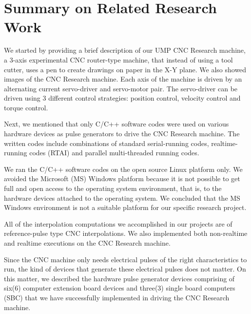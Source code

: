 \pagebreak
\section{Summary on Related Research Work}

We started by providing a brief description of our UMP CNC Research machine, a 3-axis experimental CNC router-type machine, that instead of using a tool cutter, uses a pen to create drawings on paper in the X-Y plane. We also showed images of the CNC Research machine. Each axis of the machine is driven by an alternating current servo-driver and servo-motor pair. The servo-driver can be driven using 3 different control strategies: position control, velocity control and torque control.
\vspace*{1\baselineskip}

Next, we mentioned that only C/C++ software codes were used on various hardware devices as pulse generators to drive the CNC Research machine. The written codes include combinations of standard serial-running codes, realtime-running codes (RTAI) and parallel multi-threaded running codes.  
\vspace*{1\baselineskip}

We ran the C/C++ software codes on the open source Linux platform only. We avoided the Microsoft (MS) Windows platform because it is not possible to get full and open access to the operating system environment, that is, to the hardware devices attached to the operating system. We concluded that the MS Windows environment is not a suitable platform for our specific research project.  
\vspace*{1\baselineskip}

All of the interpolation computations we accomplished in our projects are of reference-pulse type CNC interpolations. We also implemented both non-realtime and realtime executions on the CNC Research machine.
\vspace*{1\baselineskip}

Since the CNC machine only needs electrical pulses of the right characteristics to run, the kind of devices that generate these electrical pulses does not matter. On this matter, we described the hardware pulse generator devices comprising of six(6) computer extension board devices and three(3) single board computers (SBC) that we have successfully implemented in driving the CNC Research machine.
\vspace*{1\baselineskip}

